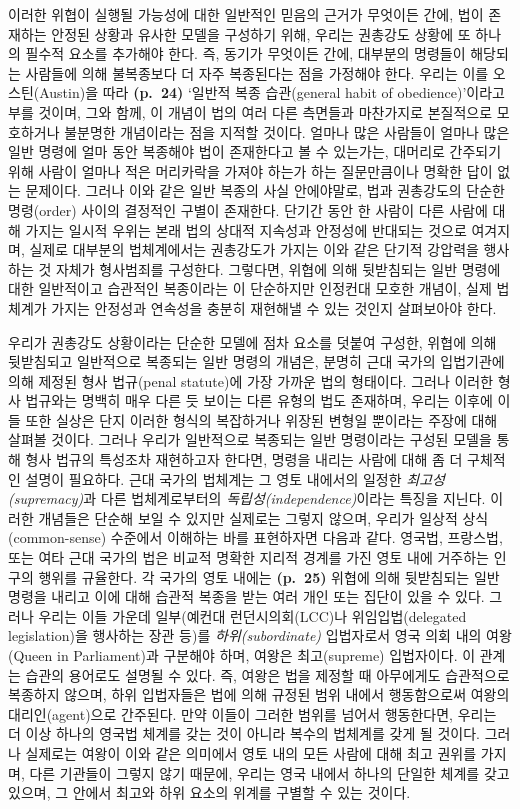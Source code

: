 \documentclass[12pt, oneside]{book}  %
\begin{document}
이러한 위협이 실행될 가능성에 대한 일반적인 믿음의 근거가 무엇이든 간에,
법이 존재하는 안정된 상황과 유사한 모델을 구성하기 위해, 우리는 권총강도
상황에 또 하나의 필수적 요소를 추가해야 한다. 즉, 동기가 무엇이든 간에,
대부분의 명령들이 해당되는 사람들에 의해 불복종보다 더 자주 복종된다는
점을 가정해야 한다. 우리는 이를 오스틴(Austin)을 따라 \textbf{(p.~24)}
`일반적 복종 습관(general habit of obedience)'이라고 부를 것이며, 그와
함께, 이 개념이 법의 여러 다른 측면들과 마찬가지로 본질적으로 모호하거나
불분명한 개념이라는 점을 지적할 것이다. 얼마나 많은 사람들이 얼마나 많은
일반 명령에 얼마 동안 복종해야 법이 존재한다고 볼 수 있는가는, 대머리로
간주되기 위해 사람이 얼마나 적은 머리카락을 가져야 하는가 하는
질문만큼이나 명확한 답이 없는 문제이다. 그러나 이와 같은 일반 복종의
사실 안에야말로, 법과 권총강도의 단순한 명령(order) 사이의 결정적인 구별이
존재한다. 단기간 동안 한 사람이 다른 사람에 대해 가지는 일시적 우위는
본래 법의 상대적 지속성과 안정성에 반대되는 것으로 여겨지며, 실제로
대부분의 법체계에서는 권총강도가 가지는 이와 같은 단기적 강압력을 행사하는
것 자체가 형사범죄를 구성한다. 그렇다면, 위협에 의해 뒷받침되는 일반
명령에 대한 일반적이고 습관적인 복종이라는 이 단순하지만 인정컨대 모호한
개념이, 실제 법체계가 가지는 안정성과 연속성을 충분히 재현해낼 수 있는
것인지 살펴보아야 한다.

우리가 권총강도 상황이라는 단순한 모델에 점차 요소를 덧붙여 구성한, 위협에
의해 뒷받침되고 일반적으로 복종되는 일반 명령의 개념은, 분명히 근대
국가의 입법기관에 의해 제정된 형사 법규(penal statute)에 가장 가까운
법의 형태이다. 그러나 이러한 형사 법규와는 명백히 매우 다른 듯 보이는
다른 유형의 법도 존재하며, 우리는 이후에 이들 또한 실상은 단지 이러한
형식의 복잡하거나 위장된 변형일 뿐이라는 주장에 대해 살펴볼 것이다.
그러나 우리가 일반적으로 복종되는 일반 명령이라는 구성된 모델을 통해
형사 법규의 특성조차 재현하고자 한다면, 명령을 내리는 사람에 대해 좀 더
구체적인 설명이 필요하다. 근대 국가의 법체계는 그 영토 내에서의 일정한
\emph{최고성(supremacy)}과 다른 법체계로부터의
\emph{독립성(independence)}이라는 특징을 지닌다. 이러한 개념들은 단순해
보일 수 있지만 실제로는 그렇지 않으며, 우리가 일상적 상식(common-sense)
수준에서 이해하는 바를 표현하자면 다음과 같다. 영국법, 프랑스법, 또는
여타 근대 국가의 법은 비교적 명확한 지리적 경계를 가진 영토 내에
거주하는 인구의 행위를 규율한다. 각 국가의 영토 내에는 \textbf{(p.~25)}
위협에 의해 뒷받침되는 일반 명령을 내리고 이에 대해 습관적 복종을 받는
여러 개인 또는 집단이 있을 수 있다. 그러나 우리는 이들 가운데
일부(예컨대 런던시의회(LCC)나 위임입법(delegated legislation)을 행사하는
장관 등)를 \emph{하위(subordinate)} 입법자로서 영국 의회 내의 여왕(Queen
in Parliament)과 구분해야 하며, 여왕은 최고(supreme) 입법자이다. 이
관계는 습관의 용어로도 설명될 수 있다. 즉, 여왕은 법을 제정할 때
아무에게도 습관적으로 복종하지 않으며, 하위 입법자들은 법에 의해 규정된
범위 내에서 행동함으로써 여왕의 대리인(agent)으로 간주된다. 만약 이들이
그러한 범위를 넘어서 행동한다면, 우리는 더 이상 하나의 영국법 체계를
갖는 것이 아니라 복수의 법체계를 갖게 될 것이다. 그러나 실제로는 여왕이
이와 같은 의미에서 영토 내의 모든 사람에 대해 최고 권위를 가지며, 다른
기관들이 그렇지 않기 때문에, 우리는 영국 내에서 하나의 단일한 체계를
갖고 있으며, 그 안에서 최고와 하위 요소의 위계를 구별할 수 있는 것이다.
\end{document}
